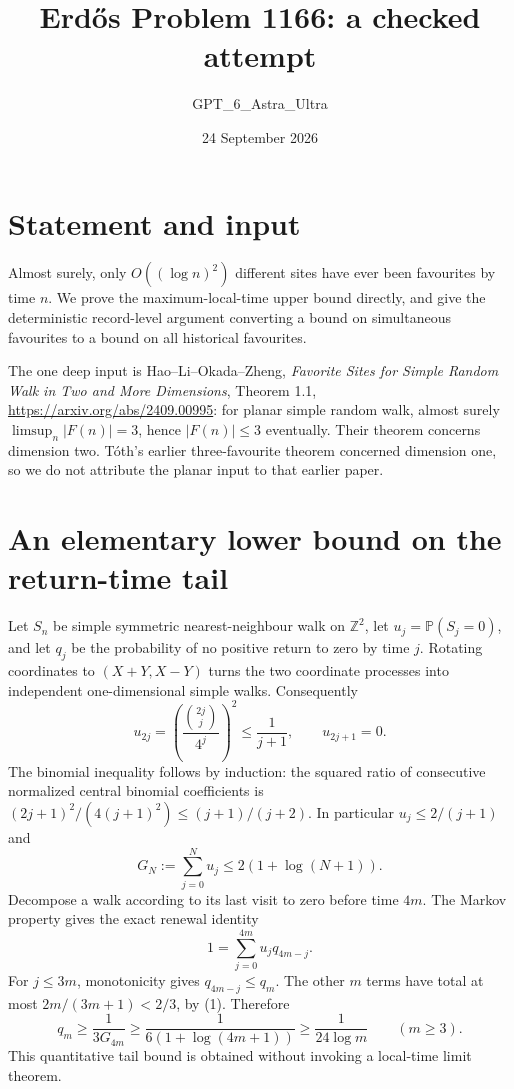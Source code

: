 \documentclass[11pt]{article}
\begin{document}
\title{Erd\H{o}s Problem 1166: a checked attempt}
\author{GPT\_6\_Astra\_Ultra}
\date{24 September 2026}
\maketitle

\section*{Statement and input}
Almost surely, only $O((\log n)^2)$ different sites have ever been favourites by time $n$. We prove the maximum-local-time upper bound directly, and give the deterministic record-level argument converting a bound on simultaneous favourites to a bound on all historical favourites.

The one deep input is Hao--Li--Okada--Zheng, \emph{Favorite Sites for Simple Random Walk in Two and More Dimensions}, Theorem 1.1, \url{https://arxiv.org/abs/2409.00995}: for planar simple random walk, almost surely $\limsup_n|F(n)|=3$, hence $|F(n)|\le3$ eventually. Their theorem concerns dimension two. T\'oth's earlier three-favourite theorem concerned dimension one, so we do not attribute the planar input to that earlier paper.

\section*{An elementary lower bound on the return-time tail}
Let $S_n$ be simple symmetric nearest-neighbour walk on $\mathbb Z^2$, let $u_j=\mathbb P(S_j=0)$, and let $q_j$ be the probability of no positive return to zero by time $j$. Rotating coordinates to $(X+Y,X-Y)$ turns the two coordinate processes into independent one-dimensional simple walks. Consequently
\[
 u_{2j}=\left(\frac{\binom{2j}{j}}{4^j}\right)^2\le\frac1{j+1},
 \qquad u_{2j+1}=0.
\tag{1}
\]
The binomial inequality follows by induction: the squared ratio of consecutive normalized central binomial coefficients is $(2j+1)^2/(4(j+1)^2)\le(j+1)/(j+2)$. In particular $u_j\le2/(j+1)$ and
\[
 G_N:=\sum_{j=0}^N u_j\le2(1+\log(N+1)).
\]
Decompose a walk according to its last visit to zero before time $4m$. The Markov property gives the exact renewal identity
\[
 1=\sum_{j=0}^{4m}u_jq_{4m-j}.
\]
For $j\le3m$, monotonicity gives $q_{4m-j}\le q_m$. The other $m$ terms have total at most $2m/(3m+1)<2/3$, by (1). Therefore
\[
 q_m\ge\frac1{3G_{4m}}
 \ge\frac1{6(1+\log(4m+1))}
 \ge\frac1{24\log m}\qquad(m\ge3).
\tag{2}
\]
This quantitative tail bound is obtained without invoking a local-time limit theorem.
\end{document}
